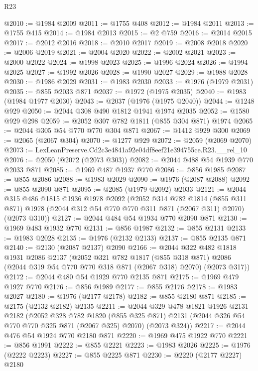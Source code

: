 \begin{lexlean}{R23}
\begin{coremodule}
@2010 := @1984 @2009
@2011 := @1755 @408
@2012 := @1984 @2011
@2013 := @1755 @415
@2014 := @1984 @2013
@2015 := @2 @759
@2016 := @2014 @2015
@2017 := @2012 @2016
@2018 := @2010 @2017
@2019 := @2008 @2018
@2020 := @2006 @2019
@2021 := @2004 @2020
@2022 := @2002 @2021
@2023 := @2000 @2022
@2024 := @1998 @2023
@2025 := @1996 @2024
@2026 := @1994 @2025
@2027 := @1992 @2026
@2028 := @1990 @2027
@2029 := @1988 @2028
@2030 := @1986 @2029
@2031 := @1983 @2030
@2033 := @1976 (@1979 @2031)
@2035 := @855 @2033 @871
@2037 := @1972 (@1975 @2035)
@2040 := @1983 (@1984 @1977 @2030)
@2043 := @2037 (@1976 (@1975 @2040))
@2044 := @1248 @929
@2050 := @2044 @308 @490 @1812 @1941 @1974 @2035
@2052 := @1580 @929 @298
@2059 := @2052 @307 @782 @1811 (@855 @304 @871) @1974
@2065 := @2044 @305 @54 @770 @770 @304 @871
@2067 := @1412 @929 @300
@2069 := @2065 (@2067 @304)
@2070 := @1277 @929
@2072 := @2059 (@2069 @2070)
@2073 := LexLeanPreserve.Cd2c3e4841a92e04df8eef21e394755ce.R23.__rel_10
@2076 := @2050 (@2072 (@2073 @303))
@2082 := @2044 @488 @54 @1939 @770 @2033 @871
@2085 := @1969 @487 @1937 @770
@2086 := @856 @1985
@2087 := @855 @2086
@2088 := @1983 @2029
@2090 := @1976 (@2087 @2088)
@2092 := @855 @2090 @871
@2095 := @2085 (@1979 @2092) @2033
@2121 := @2044
    @315
    @486
    @1815
    @1936
    @1978
    @2092
    (@2052
      @314
      @782
      @1814
      (@855 @311 @871)
      @1978
      (@2044 @312 @54 @770 @770 @311 @871 (@2067 @311) @2070)
      (@2073 @310))
@2127 := @2044 @484 @54 @1934 @770 @2090 @871
@2130 := @1969 @483 @1932 @770
@2131 := @856 @1987
@2132 := @855 @2131
@2133 := @1983 @2028
@2135 := @1976 (@2132 @2133)
@2137 := @855 @2135 @871
@2140 := @2130 (@2087 @2137) @2090
@2166 := @2044
    @322
    @482
    @1818
    @1931
    @2086
    @2137
    (@2052
      @321
      @782
      @1817
      (@855 @318 @871)
      @2086
      (@2044 @319 @54 @770 @770 @318 @871 (@2067 @318) @2070)
      (@2073 @317))
@2172 := @2044 @480 @54 @1929 @770 @2135 @871
@2175 := @1969 @479 @1927 @770
@2176 := @856 @1989
@2177 := @855 @2176
@2178 := @1983 @2027
@2180 := @1976 (@2177 @2178)
@2182 := @855 @2180 @871
@2185 := @2175 (@2132 @2182) @2135
@2211 := @2044
    @329
    @478
    @1821
    @1926
    @2131
    @2182
    (@2052
      @328
      @782
      @1820
      (@855 @325 @871)
      @2131
      (@2044 @326 @54 @770 @770 @325 @871 (@2067 @325) @2070)
      (@2073 @324))
@2217 := @2044 @476 @54 @1924 @770 @2180 @871
@2220 := @1969 @475 @1922 @770
@2221 := @856 @1991
@2222 := @855 @2221
@2223 := @1983 @2026
@2225 := @1976 (@2222 @2223)
@2227 := @855 @2225 @871
@2230 := @2220 (@2177 @2227) @2180

\end{coremodule}
\end{lexlean}
